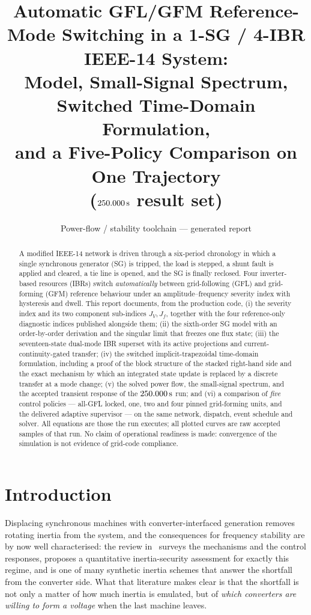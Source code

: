 \documentclass[12pt,a4paper]{article}
\title{\bfseries Automatic GFL/GFM Reference-Mode Switching in a
1-SG / 4-IBR IEEE-14 System:\\[2pt]
\large Model, Small-Signal Spectrum, Switched Time-Domain Formulation,\\
and a Five-Policy Comparison on One Trajectory\\[2pt]
\normalsize ($\NewRunEnd\second$ result set)}
\author{Power-flow / stability toolchain --- generated report}
\date{}
\theoremstyle{remark}
\newcommand{\second}{\,\mathrm{s}}
\begin{document}
\maketitle
\thispagestyle{fancy}

\begin{abstract}
\noindent
A modified IEEE-14 network is driven through a six-period chronology in which a
single synchronous generator (SG) is tripped, the load is stepped, a shunt fault
is applied and cleared, a tie line is opened, and the SG is finally reclosed.
Four inverter-based resources (IBRs) switch \emph{automatically} between
grid-following (GFL) and grid-forming (GFM) reference behaviour under an
amplitude--frequency severity index with hysteresis and dwell. This report
documents, from the production code, (i) the severity index and its two
component sub-indices $J_V,J_f$, together with the four reference-only
diagnostic indices published alongside them; (ii) the sixth-order SG model with
an order-by-order derivation and the singular limit that freezes one flux state;
(iii) the seventeen-state dual-mode IBR superset with its active projections and
current-continuity-gated transfer; (iv) the switched implicit-trapezoidal
time-domain formulation, including a proof of the block structure of the stacked
right-hand side and the exact mechanism by which an integrated state update is
replaced by a discrete transfer at a mode change; (v) the solved power flow, the
small-signal spectrum, and the accepted transient response of the
$\NewRunEnd\second$ run; and (vi) a comparison of \emph{five} control policies
--- all-GFL locked, one, two and four pinned grid-forming units, and the
delivered adaptive supervisor --- on the same network, dispatch, event schedule
and solver. All equations are those the run executes; all plotted curves are raw
accepted samples of that run. No claim of operational readiness is made:
convergence of the simulation is not evidence of grid-code compliance.
\end{abstract}

\tableofcontents

\section{Introduction}\label{sec:intro}
Displacing synchronous machines with converter-interfaced generation removes
rotating inertia from the system, and the consequences for frequency stability are
by now well characterised: the review in~\cite{he2024} surveys the mechanisms and
the control responses, \cite{zhang2025} proposes a quantitative inertia-security
assessment for exactly this regime, and \cite{nema2022} is one of many synthetic
inertia schemes that answer the shortfall from the converter side. What that
literature makes clear is that the shortfall is not only a matter of how much
inertia is emulated, but of \emph{which converters are willing to form a voltage}
when the last machine leaves.
\end{document}
